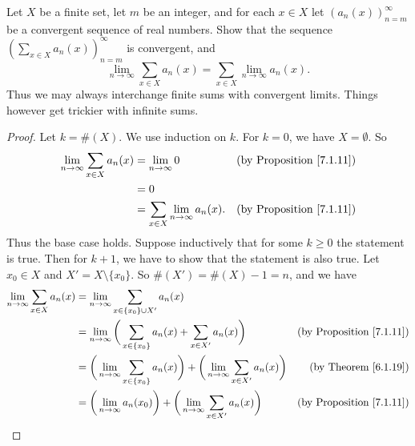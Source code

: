\begin{exercise}\label{ex 7.1.5}
    Let \(X\) be a finite set, let \(m\) be an integer, and for each \(x \in X\) let \((a_n(x))_{n = m}^\infty\) be a convergent sequence of real numbers.
    Show that the sequence \((\sum_{x \in X} a_n(x))_{n = m}^\infty\) is convergent, and
    \[
        \lim_{n \to \infty} \sum_{x \in X} a_n(x) = \sum_{x \in X} \lim_{n \to \infty} a_n(x).
    \]
    Thus we may always interchange finite sums with convergent limits.
    Things however get trickier with infinite sums.
\end{exercise}

\begin{proof}
    Let \(k = \#(X)\).
    We use induction on \(k\).
    For \(k = 0\), we have \(X = \emptyset\).
    So
    \begin{align*}
        \lim_{n \to \infty} \sum_{x \in X} a_n(x) & = \lim_{n \to \infty} 0                      & \text{(by Proposition \ref{7.1.11})} \\
                                                  & = 0                                                                                 \\
                                                  & = \sum_{x \in X} \lim_{n \to \infty} a_n(x). & \text{(by Proposition \ref{7.1.11})}
    \end{align*}
    Thus the base case holds.
    Suppose inductively that for some \(k \geq 0\) the statement is true.
    Then for \(k + 1\), we have to show that the statement is also true.
    Let \(x_0 \in X\) and \(X' = X \setminus \{x_0\}\).
    So \(\#(X') = \#(X) - 1 = n\), and we have
    \begin{align*}
        \lim_{n \to \infty} \sum_{x \in X} a_n(x) & = \lim_{n \to \infty} \sum_{x \in \{x_0\} \cup X'} a_n(x)                                                                                                     \\
                                                  & = \lim_{n \to \infty} \bigg(\sum_{x \in \{x_0\}} a_n(x) + \sum_{x \in X'} a_n(x)\bigg)                                 & \text{(by Proposition \ref{7.1.11})} \\
                                                  & = \bigg(\lim_{n \to \infty} \sum_{x \in \{x_0\}} a_n(x)\bigg) + \bigg(\lim_{n \to \infty} \sum_{x \in X'} a_n(x)\bigg) & \text{(by Theorem \ref{6.1.19})}     \\
                                                  & = \bigg(\lim_{n \to \infty} a_n(x_0)\bigg) + \bigg(\lim_{n \to \infty} \sum_{x \in X'} a_n(x)\bigg)                    & \text{(by Proposition \ref{7.1.11})} \\

\end{align*}
\end{proof}
